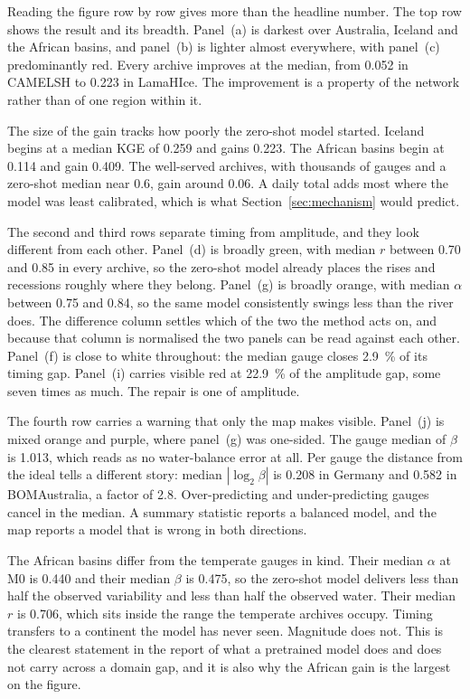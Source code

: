\documentclass[11pt,a4paper]{article}
\begin{document}
Reading the figure row by row gives more than the headline number. The top row shows the result and its breadth. Panel~(a) is darkest over Australia, Iceland and the African basins, and panel~(b) is lighter almost everywhere, with panel~(c) predominantly red. Every archive improves at the median, from \num{+0.052} in CAMELSH to \num{+0.223} in LamaHIce. The improvement is a property of the network rather than of one region within it.

The size of the gain tracks how poorly the zero-shot model started. Iceland begins at a median KGE of \num{0.259} and gains \num{+0.223}. The African basins begin at \num{0.114} and gain \num{+0.409}. The well-served archives, with thousands of gauges and a zero-shot median near \num{0.6}, gain around \num{0.06}. A daily total adds most where the model was least calibrated, which is what Section~\ref{sec:mechanism} would predict.

The second and third rows separate timing from amplitude, and they look different from each other. Panel~(d) is broadly green, with median $r$ between \num{0.70} and \num{0.85} in every archive, so the zero-shot model already places the rises and recessions roughly where they belong. Panel~(g) is broadly orange, with median $\alpha$ between \num{0.75} and \num{0.84}, so the same model consistently swings less than the river does. The difference column settles which of the two the method acts on, and because that column is normalised the two panels can be read against each other. Panel~(f) is close to white throughout: the median gauge closes \SI{2.9}{\percent} of its timing gap. Panel~(i) carries visible red at \SI{22.9}{\percent} of the amplitude gap, some seven times as much. The repair is one of amplitude.

The fourth row carries a warning that only the map makes visible. Panel~(j) is mixed orange and purple, where panel~(g) was one-sided. The gauge median of $\beta$ is \num{1.013}, which reads as no water-balance error at all. Per gauge the distance from the ideal tells a different story: median $|\log_2 \beta|$ is \num{0.208} in Germany and \num{0.582} in BOMAustralia, a factor of \num{2.8}. Over-predicting and under-predicting gauges cancel in the median. A summary statistic reports a balanced model, and the map reports a model that is wrong in both directions.

The African basins differ from the temperate gauges in kind. Their median $\alpha$ at M0 is \num{0.440} and their median $\beta$ is \num{0.475}, so the zero-shot model delivers less than half the observed variability and less than half the observed water. Their median $r$ is \num{0.706}, which sits inside the range the temperate archives occupy. Timing transfers to a continent the model has never seen. Magnitude does not. This is the clearest statement in the report of what a pretrained model does and does not carry across a domain gap, and it is also why the African gain is the largest on the figure.
\end{document}
